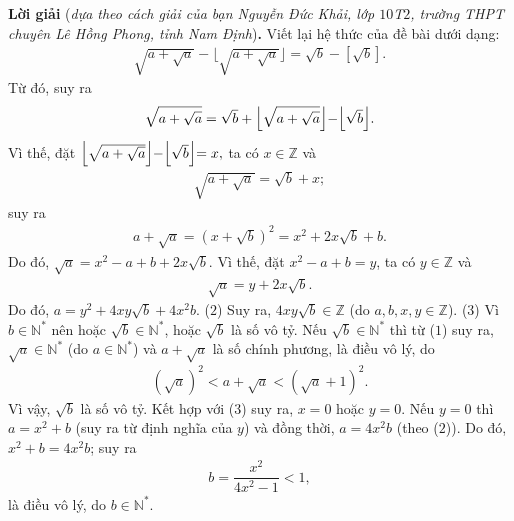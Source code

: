 \begin{multicols}{2}
	\vskip 0.05cm
	\textbf{\color{thachthuctoanhoc}Lời giải} (\textit{dựa theo cách giải của bạn Nguyễn Đức Khải, lớp $10$T$2$, trường THPT chuyên Lê Hồng Phong, tỉnh Nam Định})\textbf{\color{thachthuctoanhoc}.}
	\vskip 0.05cm
	Viết lại hệ thức của đề bài dưới dạng:
	\begin{align*}
		\sqrt {a + \sqrt a }  - \lfloor {\sqrt {a + \sqrt a } } \rfloor = \sqrt b  - \left[ {\sqrt b } \right].
	\end{align*}
	Từ đó, suy ra
	\begin{align*}
		\sqrt {a + \sqrt a }  = \sqrt b  + \Bigl\lfloor {\sqrt {a + \sqrt a } } \Bigl\rfloor - \Bigl\lfloor {\sqrt b } \Bigl\rfloor.
	\end{align*}
	Vì thế, đặt $\Bigl\lfloor {\sqrt {a + \sqrt a } }\Bigl\rfloor - \Bigl\lfloor {\sqrt b } \Bigl\rfloor = x,$  ta có $x \in \mathbb{Z}$ và
	\begin{align*}
		\sqrt {a + \sqrt a }  = \sqrt b  + x;
	\end{align*}
	suy ra
	\begin{align*}
		a \!+\! \sqrt a  \!=\! {\left( {x \!+\! \sqrt b } \right)^2} \!=\! {x^2} \!+\! 2x\sqrt b  \!+\! b. \tag{$1$}
	\end{align*}
	Do đó, $\sqrt a  = {x^2} - a + b + 2x\sqrt b.$
	\vskip 0.05cm
	Vì thế, đặt ${x^2} - a + b = y$,  ta có  $y \in \mathbb{Z}$ và
	\begin{align*}
		\sqrt a  = y + 2x\sqrt b .
	\end{align*}
	Do đó, $a = {y^2} + 4xy\sqrt b  + 4{x^2}b$. \hfill ($2$)
	\vskip 0.05cm
	Suy ra, $4xy\sqrt{b} \in \mathbb{Z}$ (do $a, b, x, y \in \mathbb{Z}$). \hfill ($3$)
	\vskip 0.05cm
	Vì $b \in \mathbb{N^*}$  nên hoặc $\sqrt{b} \in \mathbb{N^*}$,  hoặc $\sqrt{b}$  là số vô tỷ.
	\vskip 0.05cm
	Nếu $\sqrt{b} \in \mathbb{N^*}$ thì từ ($1$) suy ra, $\sqrt{a} \in \mathbb{N^*}$  (do  $a \in \mathbb{N^*}$) và $a + \sqrt{a}$  là số chính phương, là điều vô lý, do
	\begin{align*}
		{\left( {\sqrt a } \right)^2} < a + \sqrt a  < {\left( {\sqrt a  + 1} \right)^2}.
	\end{align*}
	Vì vậy, $\sqrt{b}$  là số vô tỷ. Kết hợp với ($3$) suy ra, $x = 0$ hoặc $y = 0$.
	\vskip 0.05cm
	Nếu $y = 0$ thì $a = x^2 + b$  (suy ra từ định nghĩa của $y$) và đồng thời, $a = 4x^2b$  (theo ($2$)). Do đó,
	${x^2} + b = 4{x^2}b$;
	suy ra
	\begin{align*}
		b = \dfrac{{{x^2}}}{{4{x^2} - 1}} < 1,
	\end{align*}
	là điều vô lý, do $b \in \mathbb{N^*}$.
	\vskip 0.05cm 

\end{multicols}
